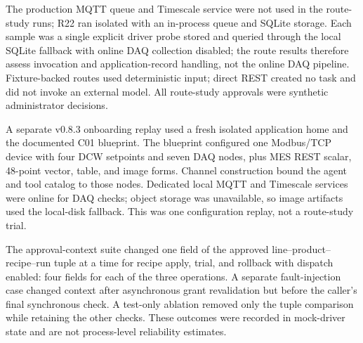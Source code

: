 The production MQTT queue and Timescale service were not used in the
route-study runs; R22 ran isolated with an in-process queue and SQLite storage.
Each sample was a single explicit driver probe stored and
queried through the local SQLite fallback with online DAQ collection disabled;
the route results therefore assess invocation and application-record handling,
not the online DAQ pipeline. Fixture-backed routes used deterministic input;
direct REST created no task and did not invoke an external model. All
route-study approvals were synthetic administrator decisions.

A separate v0.8.3 onboarding replay used a fresh isolated application home and
the documented C01 blueprint. The blueprint configured one Modbus/TCP device
with four DCW setpoints and seven DAQ nodes, plus MES REST scalar, 48-point
vector, table, and image forms. Channel construction bound the agent and tool
catalog to those nodes. Dedicated local MQTT and Timescale services were online
for DAQ checks; object storage was unavailable, so image artifacts used the
local-disk fallback. This was one configuration replay, not a route-study
trial.

The approval-context suite changed one field of the approved
line--product--recipe--run tuple at a time for recipe apply, trial, and rollback
with dispatch enabled: four fields for each of the three operations. A separate
fault-injection case changed context after asynchronous grant revalidation but
before the caller's final synchronous check. A test-only ablation removed only
the tuple comparison while retaining the other checks. These outcomes were
recorded in mock-driver state and are not process-level reliability estimates.

